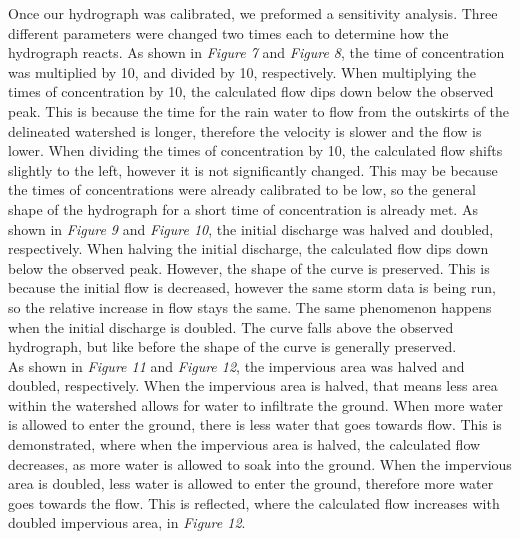 \documentclass{article}
\begin{document}
\indent Once our hydrograph was calibrated, we preformed a sensitivity analysis. Three different parameters were changed two times each to determine how the hydrograph reacts. As shown in \emph{Figure 7} and \emph{Figure 8}, the time of concentration was multiplied by 10, and divided by 10, respectively. When multiplying the times of concentration by 10, the calculated flow dips down below the observed peak. This is because the time for the rain water to flow from the outskirts of the delineated watershed is longer, therefore the velocity is slower and the flow is lower. When dividing the times of concentration by 10, the calculated flow shifts slightly to the left, however it is not significantly changed. This  may be because the times of concentrations were already calibrated to be low, so the general shape of the hydrograph for a short time of concentration is already met. As shown in \emph{Figure 9} and \emph{Figure 10}, the initial discharge was halved and doubled, respectively. When halving the initial discharge, the calculated flow dips down below the observed peak. However, the shape of the curve is preserved. This is because the initial flow is decreased, however the same storm data is being run, so the relative increase in flow stays the same. The same phenomenon happens when the initial discharge is doubled. The curve falls above the observed hydrograph, but like before the shape of the curve is generally preserved. \\
\indent As shown in \emph{Figure 11} and \emph{Figure 12}, the impervious area was halved and doubled, respectively. When the impervious area is halved, that means less area within the watershed allows for water to infiltrate the ground. When more water is allowed to enter the ground, there is less water that goes towards flow. This is demonstrated, where when the impervious area is halved, the calculated flow decreases, as more water is allowed to soak into the ground. When the impervious area is doubled, less water is allowed to enter the ground, therefore more water goes towards the flow. This is reflected, where the calculated flow increases with doubled impervious area, in \emph{Figure 12}. 
\newpage
\end{document}
